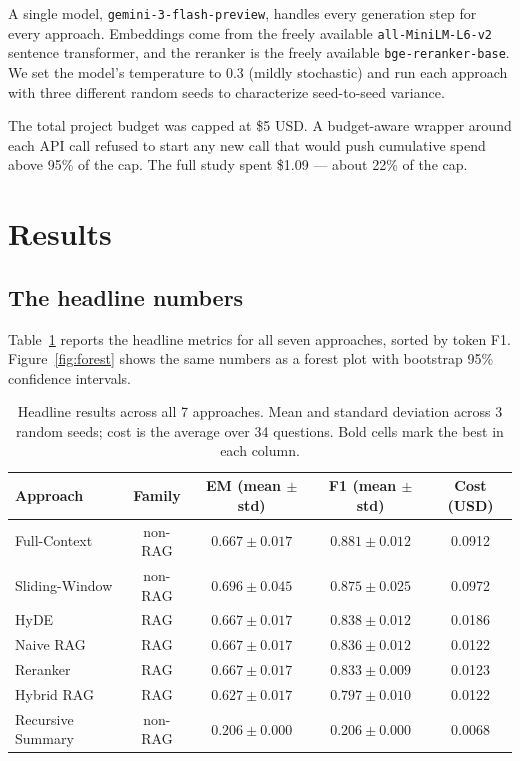 \documentclass[11pt,a4paper]{article}
\begin{document}
A single model, \texttt{gemini-3-flash-preview}, handles every generation step for every approach. Embeddings come from the freely available \texttt{all-MiniLM-L6-v2} sentence transformer, and the reranker is the freely available \texttt{bge-reranker-base}. We set the model's temperature to 0.3 (mildly stochastic) and run each approach with three different random seeds to characterize seed-to-seed variance.

The total project budget was capped at \$5 USD. A budget-aware wrapper around each API call refused to start any new call that would push cumulative spend above 95\% of the cap. The full study spent \$1.09 — about 22\% of the cap.

\section{Results}

\subsection{The headline numbers}

Table~\ref{tab:headline} reports the headline metrics for all seven approaches, sorted by token F1. Figure~\ref{fig:forest} shows the same numbers as a forest plot with bootstrap 95\% confidence intervals.

\begin{table}[t]
\centering
\small
\begin{tabular}{lcccc}
\toprule
\textbf{Approach} & \textbf{Family} & \textbf{EM (mean $\pm$ std)} & \textbf{F1 (mean $\pm$ std)} & \textbf{Cost (USD)} \\
\midrule
Full-Context        & non-RAG & $0.667 \pm 0.017$ & $\mathbf{0.881 \pm 0.012}$ & 0.0912 \\
Sliding-Window      & non-RAG & $\mathbf{0.696 \pm 0.045}$ & $0.875 \pm 0.025$ & 0.0972 \\
HyDE                & RAG     & $0.667 \pm 0.017$ & $0.838 \pm 0.012$ & 0.0186 \\
Naive RAG           & RAG     & $0.667 \pm 0.017$ & $0.836 \pm 0.012$ & 0.0122 \\
Reranker            & RAG     & $0.667 \pm 0.017$ & $0.833 \pm 0.009$ & 0.0123 \\
Hybrid RAG          & RAG     & $0.627 \pm 0.017$ & $0.797 \pm 0.010$ & 0.0122 \\
Recursive Summary   & non-RAG & $0.206 \pm 0.000$ & $0.206 \pm 0.000$ & 0.0068 \\
\bottomrule
\end{tabular}
\caption{Headline results across all 7 approaches. Mean and standard deviation across 3 random seeds; cost is the average over 34 questions. Bold cells mark the best in each column.}
\label{tab:headline}
\end{table}
\end{document}
